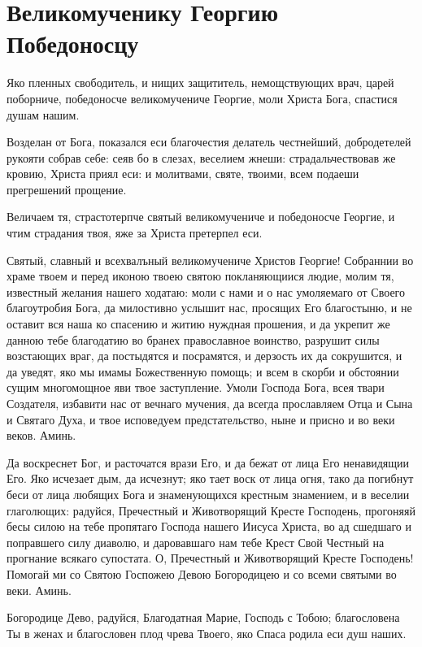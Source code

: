 \mychapterending{}


\section{Великомученику Георгию Победоносцу}\begin{mymulticols}
 

{\centering{}\par}

Яко пленных свободитель, и нищих защититель, немощствующих врач, царей поборниче, победоносче великомучениче Георгие, моли Христа Бога, спастися душам нашим.


Возделан от Бога, показался еси благочестия делатель честнейший, добродетелей рукояти собрав себе: сеяв бо в слезах, веселием жнеши: страдальчествовав же кровию, Христа приял еси: и молитвами, святе, твоими, всем подаеши прегрешений прощение.


Величаем тя, страстотерпче святый великомучениче и победоносче Георгие, и чтим страдания твоя, яже за Христа претерпел еси.


Святый, славный и всехвалъный великомучениче Христов Георгие! Собраннии во храме твоем и перед иконою твоею святою покланяющиися людие, молим тя, известный желания нашего ходатаю: моли с нами и о нас умоляемаго от Своего благоутробия Бога, да милостивно услышит нас, просящих Его благостыню, и не оставит вся наша ко спасению и житию нуждная прошения, и да укрепит же данною тебе благодатию во бранех православное воинство, разрушит силы возстающих враг, да постыдятся и посрамятся, и дерзость их да сокрушится, и да уведят, яко мы имамы Божественную помощь; и всем в скорби и обстоянии сущим многомощное яви твое заступление. Умоли Господа Бога, всея твари Создателя, избавити нас от вечнаго мучения, да всегда прославляем Отца и Сына и Святаго Духа, и твое исповедуем предстательство, ныне и присно и во веки веков. Аминь.

Да воскреснет Бог, и расточатся врази Его, и да бежат от лица Его ненавидящии Его. Яко исчезает дым, да исчезнут; яко тает воск от лица огня, тако да погибнут беси от лица любящих Бога и знаменующихся крестным знамением, и в веселии глаголющих: радуйся, Пречестный и Животворящий Кресте Господень, прогоняяй бесы силою на тебе пропятаго Господа нашего Иисуса Христа, во ад сшедшаго и поправшего силу диаволю, и даровавшаго нам тебе Крест Свой Честный на прогнание всякаго супостата. О, Пречестный и Животворящий Кресте Господень! Помогай ми со Святою Госпожею Девою Богородицею и со всеми святыми во веки. Аминь.

Богородице Дево, радуйся, Благодатная Марие, Господь с Тобою; благословена Ты в женах и благословен плод чрева Твоего, яко Спаса родила еси душ наших.

\end{mymulticols}

